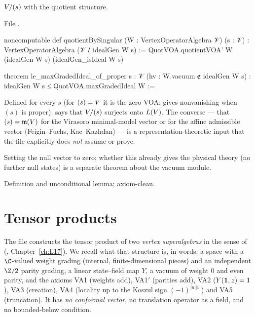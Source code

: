 \begin{definition}\label{l04:def:quotsing}
$V/(s)$ with the quotient structure.
\end{definition}
\noindent File .
\begin{leancode}
noncomputable def quotientBySingular (W : VertexOperatorAlgebra 𝒱) (s : 𝒱) :
    VertexOperatorAlgebra (𝒱 ⧸ idealGen W s) :=
  QuotVOA.quotientVOA' W (idealGen W s) (idealGen_isIdeal W s)

theorem le_maxGradedIdeal_of_proper {s : 𝒱} (hv : W.vacuum ∉ idealGen W s) :
    idealGen W s ≤ QuotVOA.maxGradedIdeal W :=
\end{leancode}
\begin{dictionary}
Defined for every $s$ (for $(s) = V$ it is the zero VOA; \allowbreak{}\allowbreak{}\allowbreak{}
gives nonvanishing when $(s)$ is proper). \allowbreak{}\allowbreak{}\allowbreak{} says that $V/(s)$
surjects onto $L(V)$. The converse --- that $(s) = \mathfrak{m}(V)$ for the Virasoro minimal-model
vector or for the affine admissible vector (Feigin--Fuchs, Kac--Kazhdan) --- is a representation-theoretic
input that the file explicitly does \emph{not} assume or prove.
\end{dictionary}
\begin{physics}
Setting the null vector to zero; whether this already gives the physical theory (no further null
states) is a separate theorem about the vacuum module.
\end{physics}
\begin{status}
Definition and unconditional lemma; axiom-clean.
\end{status}

\section{Tensor products}\label{l04:sec:tensor}

The file  constructs the tensor product of two
\emph{vertex superalgebras} in the sense of 
(, Chapter~\ref{ch:L17}). We recall
what that structure is, in words: a space with a $\C$-valued weight grading (internal, finite-dimensional
pieces) and an independent $\Z/2$ parity grading, a linear state--field map $Y$, a vacuum of weight $0$
and even parity, and the axioms VA1 (weights add), VA1$'$ (parities add), VA2 ($Y(\mathbf{1},z) = 1$),
VA3 (creation), VA4 (locality up to the Koszul sign $(-1)^{|u||v|}$) and VA5 (truncation). It has
\emph{no conformal vector}, no translation operator as a field, and no bounded-below condition.

